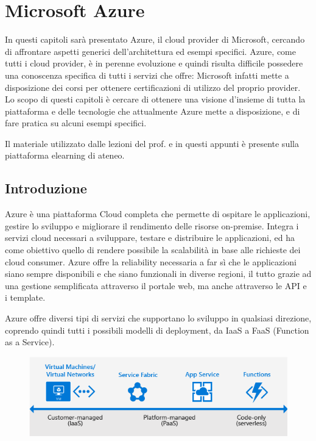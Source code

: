 \chapter{Microsoft Azure}

In questi capitoli sarà presentato Azure, il cloud provider di Microsoft, cercando di affrontare aspetti generici dell'architettura ed esempi specifici. Azure, come tutti i cloud provider, è in perenne evoluzione e quindi risulta difficile possedere una conoscenza specifica di tutti i servizi che offre: Microsoft infatti mette a disposizione dei corsi per ottenere certificazioni di utilizzo del proprio provider. Lo scopo di questi capitoli è cercare di ottenere una visione d'insieme di tutta la piattaforma e delle tecnologie che attualmente Azure mette a disposizione, e di fare pratica su alcuni esempi specifici.

Il materiale utilizzato dalle lezioni del prof. e in questi appunti è presente sulla piattaforma elearning di ateneo.

\section{Introduzione}
Azure è una piattaforma Cloud completa che permette di ospitare le applicazioni, gestire lo sviluppo e migliorare il rendimento delle risorse on-premise. Integra i servizi cloud necessari a sviluppare, testare e distribuire le applicazioni, ed ha come obiettivo quello di rendere possibile la scalabilità in base alle richieste dei cloud consumer. Azure offre la reliability necessaria a far sì che le applicazioni siano sempre disponibili e che siano funzionali in diverse regioni, il tutto grazie ad una gestione semplificata attraverso il portale web, ma anche attraverso le API e i template.

\vspace{5mm}

Azure offre diversi tipi di servizi che supportano lo sviluppo in qualsiasi direzione, coprendo quindi tutti i possibili modelli di deployment, da IaaS a FaaS (Function as a Service).

\begin{figure}[htb!]
    \centering
    \includegraphics[width=12cm]{./Images/cap14/14.1.png}
\end{figure}

